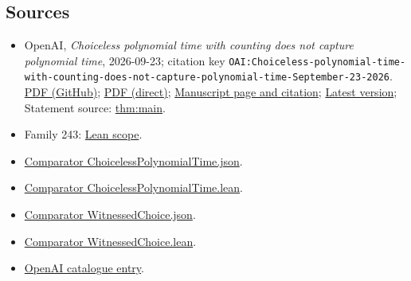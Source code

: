 \documentclass[11pt]{article}
\begin{document}
\subsection{Sources}
\begin{itemize}
\item OpenAI, \emph{Choiceless polynomial time with counting does not capture polynomial time}, 2026-09-23; citation key \texttt{OAI:Choiceless-polynomial-time-with-counting-does-not-capture-polynomial-time-September-23-2026}. \href{https://github.com/openai/math/blob/adc7f1241b42e322a6451854ab7e4b4c146bf78a/preprints/Choiceless-polynomial-time-with-counting-does-not-capture-polynomial-time-September-23-2026/paper.pdf}{PDF (GitHub)}; \href{https://github.com/openai/math/raw/adc7f1241b42e322a6451854ab7e4b4c146bf78a/preprints/Choiceless-polynomial-time-with-counting-does-not-capture-polynomial-time-September-23-2026/paper.pdf}{PDF (direct)}; \href{https://github.com/openai/math/blob/adc7f1241b42e322a6451854ab7e4b4c146bf78a/preprints/Choiceless-polynomial-time-with-counting-does-not-capture-polynomial-time-September-23-2026/README.md}{Manuscript page and citation}; \href{https://github.com/openai/math/blob/main/preprints/Choiceless-polynomial-time-with-counting-does-not-capture-polynomial-time-September-23-2026/paper.pdf}{Latest version}; Statement source: \href{https://github.com/openai/math/blob/adc7f1241b42e322a6451854ab7e4b4c146bf78a/preprints/Choiceless-polynomial-time-with-counting-does-not-capture-polynomial-time-September-23-2026/build/sections/00-introduction.tex\#L81}{thm:main}.
\item Family 243: \href{https://github.com/openai/math/blob/adc7f1241b42e322a6451854ab7e4b4c146bf78a/lean/docs/243.md}{Lean scope}.
\item \href{https://github.com/openai/math/blob/adc7f1241b42e322a6451854ab7e4b4c146bf78a/lean/ComparatorChallenges/ChoicelessPolynomialTime.json}{Comparator ChoicelessPolynomialTime.json}.
\item \href{https://github.com/openai/math/blob/adc7f1241b42e322a6451854ab7e4b4c146bf78a/lean/ComparatorChallenges/ChoicelessPolynomialTime.lean}{Comparator ChoicelessPolynomialTime.lean}.
\item \href{https://github.com/openai/math/blob/adc7f1241b42e322a6451854ab7e4b4c146bf78a/lean/ComparatorChallenges/WitnessedChoice.json}{Comparator WitnessedChoice.json}.
\item \href{https://github.com/openai/math/blob/adc7f1241b42e322a6451854ab7e4b4c146bf78a/lean/ComparatorChallenges/WitnessedChoice.lean}{Comparator WitnessedChoice.lean}.
\item \href{https://github.com/openai/math/blob/adc7f1241b42e322a6451854ab7e4b4c146bf78a/CONTENTS.md}{OpenAI catalogue entry}.
\end{itemize}
\end{document}
